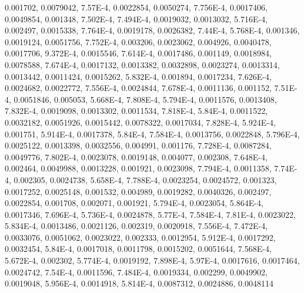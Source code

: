 0.001702, 0.0079042, 7.57E-4, 0.0022854, 0.0050274, 7.756E-4, 0.0017406, 0.0049854, 0.001348, 7.502E-4, 7.494E-4, 0.0019032, 0.0013032, 5.716E-4, 0.002497, 0.0015338, 7.764E-4, 0.0019178, 0.0026382, 7.44E-4, 5.768E-4, 0.001346, 0.0019124, 0.0051756, 7.752E-4, 0.003206, 0.0023062, 0.004926, 0.0040478, 0.0017706, 9.372E-4, 0.0015546, 7.614E-4, 0.0017486, 0.001149, 0.0018984, 0.0078588, 7.674E-4, 0.0017132, 0.0013382, 0.0032898, 0.0023274, 0.0013314, 0.0013442, 0.0011424, 0.0015262, 5.832E-4, 0.001894, 0.0017234, 7.626E-4, 0.0024682, 0.0022772, 7.556E-4, 0.0024844, 7.678E-4, 0.0011136, 0.001152, 7.51E-4, 0.0051846, 0.005053, 5.668E-4, 7.808E-4, 5.794E-4, 0.0011576, 0.0013408, 7.832E-4, 0.0019098, 0.0013302, 0.0011534, 7.818E-4, 5.84E-4, 0.0011522, 0.0032182, 0.0051926, 0.0015442, 0.0078322, 0.0017034, 7.828E-4, 5.924E-4, 0.001751, 5.914E-4, 0.0017378, 5.84E-4, 7.584E-4, 0.0013756, 0.0022848, 5.796E-4, 0.0025122, 0.0013398, 0.0032556, 0.004991, 0.001176, 7.728E-4, 0.0087284, 0.0049776, 7.802E-4, 0.0023078, 0.0019148, 0.004077, 0.002308, 7.648E-4, 0.002464, 0.0049988, 0.0013228, 0.001921, 0.0023098, 7.794E-4, 0.0011358, 7.74E-4, 0.002305, 0.0024738, 5.658E-4, 7.788E-4, 0.0023254, 0.0024572, 0.001323, 0.0017252, 0.0025148, 0.001532, 0.004989, 0.0019282, 0.0040326, 0.002497, 0.0022854, 0.001708, 0.002071, 0.001921, 5.794E-4, 0.0023054, 5.864E-4, 0.0017346, 7.696E-4, 5.736E-4, 0.0024878, 5.77E-4, 7.584E-4, 7.81E-4, 0.0023022, 5.834E-4, 0.0013486, 0.0021126, 0.002319, 0.0020918, 7.556E-4, 7.472E-4, 0.0033076, 0.0051062, 0.0023022, 0.002333, 0.0012954, 5.912E-4, 0.0017292, 0.0032454, 5.84E-4, 0.0017018, 0.0011798, 0.0015202, 0.0051644, 7.568E-4, 5.672E-4, 0.002302, 5.774E-4, 0.0019192, 7.898E-4, 5.97E-4, 0.0017616, 0.0017464, 0.0024742, 7.54E-4, 0.0011596, 7.484E-4, 0.0019334, 0.002299, 0.0049902, 0.0019048, 5.956E-4, 0.0014918, 5.814E-4, 0.0087312, 0.0024886, 0.0048114